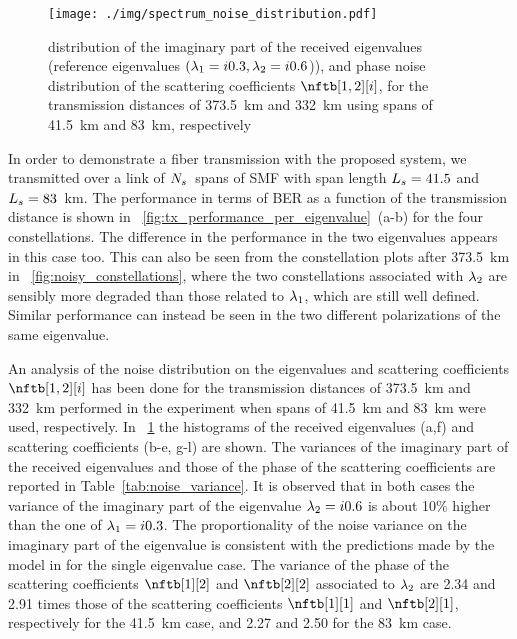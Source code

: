 \begin{figure}[p]
  \texttt{[image: ./img/spectrum\_noise\_distribution.pdf]}

  \caption{ distribution of the imaginary part of the received eigenvalues (reference eigenvalues $(\eig[1] = i 0.3, \eig[2] = \iunit0.6$)), and phase noise distribution of the scattering coefficients $\nftb[1,2][i]$, for the transmission distances of  \SI{373.5}{\km} and  \SI{332}{\km} using spans of \SI{41.5}{\km} and \SI{83}{\km}, respectively}
  \label{fig:spectrum_noise_distribution}
\end{figure}

In order to demonstrate a fiber transmission with the proposed system, we transmitted over a link of $\nspans$~spans of \ac{SMF}  with span length $\spanl=41.5$ and $\spanl=83$~km. The
performance in terms of \ac{BER} as a function of the transmission distance
is shown in \figurename~\ref{fig:tx_performance_per_eigenvalue}~(a-b) for the four  constellations. The difference
in the performance in the two eigenvalues appears in this case too. This can also be seen from the constellation
plots after \SI{373.5}{\km} in \figurename~\ref{fig:noisy_constellations}, where the two constellations associated with $\eig[2]$ are
sensibly more degraded than those related to $\eig[1]$, which are still well
defined. Similar performance can instead be seen in the two different
polarizations of the same eigenvalue.

An analysis of the noise distribution on the  eigenvalues and scattering coefficients $\nftb[1,2][i]$ has been done for the  transmission distances  of \SI{373.5}{\km} and \SI{332}{\km} performed in the experiment when spans of \SI{41.5}{\km} and \SI{83}{\km} were used, respectively. In \figurename~\ref{fig:spectrum_noise_distribution} the histograms
of the received eigenvalues (a,f) and scattering coefficients (b-e, g-l) are shown. The variances of the imaginary part of the received eigenvalues and those of the phase of the scattering coefficients are reported in Table~\ref{tab:noise_variance}.
It is observed that in  both cases the variance of the imaginary part of the eigenvalue $\eig[2] = \iunit0.6$ is about 10\% higher than the one of $\eig[1] = \iunit0.3$. The proportionality of the noise variance on the  imaginary part of the eigenvalue is consistent with the predictions made by the model in \cite{zhang2015gaussian} for the single eigenvalue case.
The variance of the phase of the scattering coefficients $\nftb[1][2]$ and $\nftb[2][2]$ associated to $\eig[2]$ are 2.34 and 2.91 times those of the scattering coefficients $\nftb[1][1]$ and $\nftb[2][1]$, respectively for the \SI{41.5}{\km} case, and 2.27 and 2.50 for the \SI{83}{\km} case.

